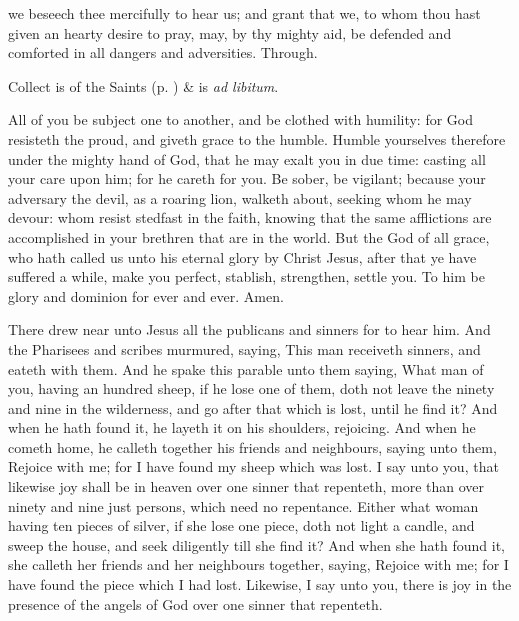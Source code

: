 \collect
{} we beseech thee mercifully to hear us; and grant that we, to whom thou hast given an hearty desire to pray, may, by thy mighty aid, be defended and comforted in all dangers and adversities. Through.
\begin{rubric}
     Collect is of the Saints (p. \pageref{SPSaints}) \&  is \emph{ad libitum}.
\end{rubric}

 All of you be subject one to another, and be clothed with humility: for God resisteth the proud, and giveth grace to the humble. Humble yourselves therefore under the mighty hand of God, that he may exalt you in due time: casting all your care upon him; for he careth for you. Be sober, be vigilant; because your adversary the devil, as a roaring lion, walketh about, seeking whom he may devour: whom resist stedfast in the faith, knowing that the same afflictions are accomplished in your brethren that are in the world. But the God of all grace, who hath called us unto his eternal glory by Christ Jesus, after that ye have suffered a while, make you perfect, stablish, strengthen, settle you. To him be glory and dominion for ever and ever. Amen.


 There drew near unto Jesus all the publicans and sinners for to hear him. And the Pharisees and scribes murmured, saying, This man receiveth sinners, and eateth with them. And he spake this parable unto them saying, What man of you, having an hundred sheep, if he lose one of them, doth not leave the ninety and nine in the wilderness, and go after that which is lost, until he find it? And when he hath found it, he layeth it on his shoulders, rejoicing. And when he cometh home, he calleth together his friends and neighbours, saying unto them, Rejoice with me; for I have found my sheep which was lost. I say unto you, that likewise joy shall be in heaven over one sinner that repenteth, more than over ninety and nine just persons, which need no repentance. Either what woman having ten pieces of silver, if she lose one piece, doth not light a candle, and sweep the house, and seek diligently till she find it? And when she hath found it, she calleth her friends and her neighbours together, saying, Rejoice with me; for I have found the piece which I had lost. Likewise, I say unto you, there is joy in the presence of the angels of God over one sinner that repenteth.

